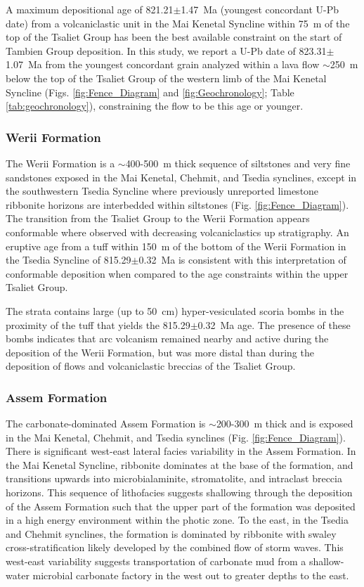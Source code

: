\documentclass[11pt,letterpaper]{article}
\begin{document}
A maximum depositional age of 821.21$\pm$1.47~Ma (youngest concordant U-Pb date) from a volcaniclastic unit in the Mai Kenetal Syncline within 75~m of the top of the Tsaliet Group \citep{Swanson-Hysell2015a} has been the best available constraint on the start of Tambien Group deposition. In this study, we report a U-Pb date of 823.31$\pm$1.07~Ma from the youngest concordant grain analyzed within a lava flow $\sim$250~m below the top of the Tsaliet Group of the western limb of the Mai Kenetal Syncline (Figs. \ref{fig:Fence_Diagram} and \ref{fig:Geochronology}; Table \ref{tab:geochronology}), constraining the flow to be this age or younger.

\subsubsection*{Werii Formation}

The Werii Formation is a $\sim$400-500~m thick sequence of siltstones and very fine sandstones exposed in the Mai Kenetal, Chehmit, and Tsedia synclines, except in the southwestern Tsedia Syncline where previously unreported limestone ribbonite horizons are interbedded within siltstones (Fig. \ref{fig:Fence_Diagram}). The transition from the Tsaliet Group to the Werii Formation appears conformable where observed with decreasing volcaniclastics up stratigraphy. An eruptive age from a tuff within 150~m of the bottom of the Werii Formation in the Tsedia Syncline of 815.29$\pm$0.32~Ma \citep{Swanson-Hysell2015a} is consistent with this interpretation of conformable deposition when compared to the age constraints within the upper Tsaliet Group.

The strata contains large (up to 50~cm) hyper-vesiculated scoria bombs in the proximity of the tuff that yields the 815.29$\pm$0.32~Ma age. The presence of these bombs indicates that arc volcanism remained nearby and active during the deposition of the Werii Formation, but was more distal than during the deposition of flows and volcaniclastic breccias of the Tsaliet Group.

\subsubsection*{Assem Formation}

The carbonate-dominated Assem Formation is $\sim$200-300~m thick and is exposed in the Mai Kenetal, Chehmit, and Tsedia synclines (Fig. \ref{fig:Fence_Diagram}). There is significant west-east lateral facies variability in the Assem Formation. In the Mai Kenetal Syncline, ribbonite dominates at the base of the formation, and transitions upwards into microbialaminite, stromatolite, and intraclast breccia horizons. This sequence of lithofacies suggests shallowing through the deposition of the Assem Formation such that the upper part of the formation was deposited in a high energy environment within the photic zone. To the east, in the Tsedia and Chehmit synclines, the formation is dominated by ribbonite with swaley cross-stratification likely developed by the combined flow of storm waves. This west-east variability suggests transportation of carbonate mud from a shallow-water microbial carbonate factory in the west out to greater depths to the east.
\end{document}
